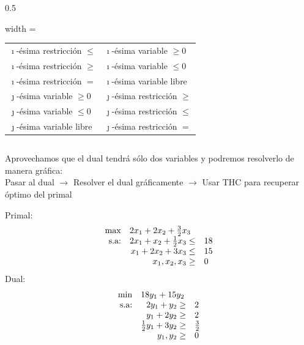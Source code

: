\documentclass[10pt, aspectratio=169,usenames,dvipsnames]{beamer}
\begin{document}
\begin{frame}{}
{\begin{columns}
\begin{column}{0.5\textwidth}
\begin{adjustbox}{width = \textwidth}
\begin{tabular}{|l|l|}
        $\imath$-ésima restricción $\leq$ & $\imath$-ésima variable $\geq 0$ \\
        $\imath$-ésima restricción $\geq$ & $\imath$-ésima variable $\leq 0$ \\
        $\imath$-ésima restricción $=$ & $\imath$-ésima variable libre \\
        $\jmath$-ésima variable $\geq 0$ & $\jmath$-ésima restricción $\geq$ \\
        $\jmath$-ésima variable $\leq 0$ & $\jmath$-ésima restricción $\leq$ \\
        $\jmath$-ésima variable libre & $\jmath$-ésima restricción $=$ \\ \hline
    \end{tabular}
    \end{adjustbox}
    \end{column}
    \end{columns}}
    \pause
    \vskip 0.3cm
    Aprovechamos que el dual tendrá sólo dos variables y podremos resolverlo de manera gráfica:\\
    Pasar al dual $\rightarrow$ Resolver el dual gráficamente $\rightarrow$ Usar THC para recuperar óptimo del primal
\end{frame}

\begin{frame}{}
    Primal:
    $$
    \begin{array}{rrl}
    \max & \multicolumn{2}{l}{2x_1+2x_2+\frac{3}{2}x_3}\\
    \text{s.a:}& 2x_1+x_2+\frac{1}{2}x_3\leq & 18\\
     & x_1+2x_2+3x_3\leq & 15\\
     & x_1, x_2, x_3\geq & 0 \\
    \end{array}
    $$
    Dual:
    $$
    \begin{array}{rrl}
    \min & \multicolumn{2}{l}{18y_1+15y_2}\\
    \text{s.a:}& 2y_1+y_2 \geq & 2 \\
     & y_1+2y_2 \geq & 2 \\
     & \frac{1}{2}y_1+3y_2\geq & \frac{3}{2}\\
     & y_1, y_2 \geq & 0\\
    \end{array}
    $$
\end{frame}
\end{document}
